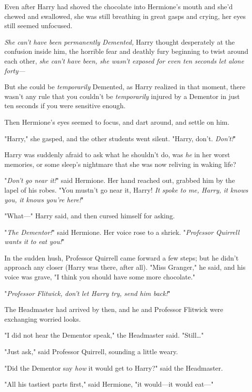 Even after Harry had shoved the chocolate into Hermione's mouth and she'd
chewed and swallowed, she was still breathing in great gasps and crying, her
eyes still seemed unfocused.

\emph{She can't have been permanently Demented,} Harry thought desperately at
the confusion inside him, the horrible fear and deathly fury beginning to twist
around each other, \emph{she can't have been, she wasn't exposed for even ten
seconds let alone forty---}

But she could be \emph{temporarily} Demented, as Harry realized in that moment,
there wasn't any rule that you couldn't be \emph{temporarily} injured by a
Dementor in just ten seconds if you were sensitive enough.

Then Hermione's eyes seemed to focus, and dart around, and settle on him.

"Harry," she gasped, and the other students went silent. "Harry, don't.
\emph{Don't!}"

Harry was suddenly afraid to ask what he shouldn't do, was \emph{he} in her
worst memories, or some sleep's nightmare that she was now reliving in waking
life?

"\emph{Don't go near it!}" said Hermione. Her hand reached out, grabbed him by
the lapel of his robes. "You mustn't go near it, Harry! \emph{It spoke to me,
Harry, it knows you, it knows you're here!}"

"What---" Harry said, and then cursed himself for asking.

"\emph{The Dementor!}" said Hermione. Her voice rose to a shriek.
"\emph{Professor Quirrell wants it to eat you!}"

In the sudden hush, Professor Quirrell came forward a few steps; but he didn't
approach any closer (Harry was there, after all). "Miss Granger," he said, and
his voice was grave, "I think you should have some more chocolate."

"\emph{Professor Flitwick, don't let Harry try, send him back!}"

The Headmaster had arrived by then, and he and Professor Flitwick were
exchanging worried looks.

"I did not hear the Dementor speak," the Headmaster said. "Still{\ldots}"

"Just ask," said Professor Quirrell, sounding a little weary.

"Did the Dementor say \emph{how} it would get to Harry?" said the Headmaster.

"All his tastiest parts first," said Hermione, "it would---it would eat---"

